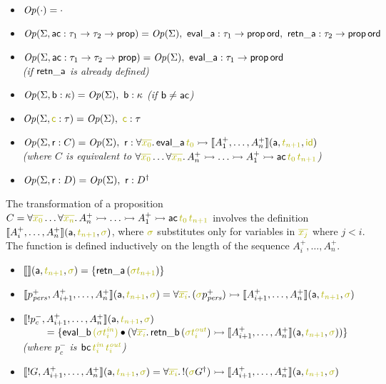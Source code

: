 \begin{itemize}
\item ${\it Op}({\cdot}) = \cdot$
\item ${\it Op}({\Sigma, {\sf ac} : \tau_1 \rightarrow \tau_2
    \rightarrow {\sf prop}}) = {\it Op}({\Sigma}), ~ {\sf eval\_a} :
  \tau_1 \rightarrow {\sf prop\,ord}, ~ {\sf retn\_a} : \tau_2
  \rightarrow {\sf prop\,ord}$ 
\item ${\it Op}({\Sigma, {\sf ac} : \tau_1 \rightarrow \tau_2
    \rightarrow {\sf prop}}) = {\it Op}({\Sigma}), ~ {\sf eval\_a} :
  \tau_1 \rightarrow {\sf prop\,ord}$ \\
{\it (if ${\sf retn\_a}$ is already defined)}
\item ${\it Op}({\Sigma, {\sf b} : \kappa}) = {\it Op}({\Sigma}), ~ {\sf b}
  : \kappa$ {\it (if ${\sf b} \neq {\sf ac}$)}
\item $\transop{\Sigma, \lf{\sf c} : \tau} = \transop{\Sigma}, ~ \lf{\sf
    c} : \tau$ 
\item $\transop{\Sigma, {\sf r} : C} = \transop{\Sigma}, ~ {\sf r}
  : \forall \lf{\overline{x_0}}.\, {\sf eval\_a}\,\lf{t_0} \lefti 
      \opbasic{A^+_1, \ldots, A^+_n}{\lf{t_{n+1}}}{\lf{\sf id}}$ \\ 
    {\it (where $C$ is
    equivalent to $\forall \lf{\overline{x_0}}\ldots \forall
    \lf{\overline{x_n}}.\, A^+_n \lefti \ldots \lefti A^+_1 \lefti {\sf
      ac}\,\lf{t_{0}}\,\lf{t_{n+1}}$)}
\item ${\it Op}({\Sigma, {\sf r} : D}) = {\it Op}({\Sigma}), ~ {\sf r}
  : {{D}^\dag}$
\end{itemize}

The transformation of a proposition $C = \forall
\lf{\overline{x_0}}\ldots \forall \lf{\overline{x_n}}.\,A^+_n \lefti \ldots
\lefti A^+_1 \lefti {\sf ac}\,\lf{t_{0}}\,\lf{t_{n+1}}$ involves the definition
$\opbasic{A^+_i,\ldots,A^+_n}{\lf{t_{n+1}}}{\lf{\sigma}}$, where $\lf\sigma$
substitutes only for variables in $\lf{\overline{x_j}}$ where $j < i$. The
function is defined inductively on the length of the sequence
$A^+_i,\ldots,A^+_n$.

\begin{itemize}
\item $\opbasic{}{t_{n+1}}{\sigma} = \{ {\sf retn\_a}\,(\lf{\sigma{t_{n+1}}}) \}$
\item $\opbasic{p^+_\mpers,A^+_{i+1},\ldots,A^+_n}{t_{n+1}}{\sigma} 
  = \forall \lf{\overline{x_i}}.\, (\lf\sigma{p^+_\mpers}) \lefti \opbasic{A^+_{i+1},\ldots,A^+_n}{t_{n+1}}{\sigma}$
\item $\opbasic{{!}p^-_c,A^+_{i+1},\ldots,A^+_n}{t_{n+1}}{\sigma}$
  \\
  $~ \qquad = \{ {\sf eval\_b}\,\lf{({\sigma}t^{\it in}_i)} \fuse
  (\forall\lf{\overline{x_i}}.\, {\sf retn\_b}\,(\lf{\sigma t^{\it out}_i})
  \lefti \opbasic{A^+_{i+1},\ldots,A^+_n}{t_{n+1}}{\sigma}) \}$\\
  {\it (where $p^-_c$ is ${\sf bc}\,\lf{t^{\it in}_i}\,\lf{t^{\it out}_i}$)}
\item $\opbasic{{!}G,A^+_{i+1},\ldots,A^+_n}{t_{n+1}}{\sigma} = \forall
  \lf{\overline{x_i}}.\, {!}(\lf\sigma\opsubst{G}) \lefti
  \opbasic{A^+_{i+1},\ldots,A^+_n}{t_{n+1}}{\sigma}$
\end{itemize}

